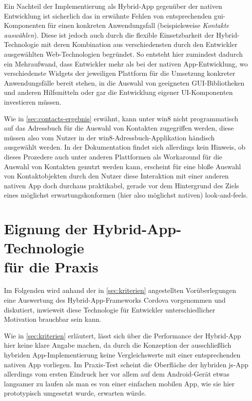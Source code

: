 Ein Nachteil der Implementierung als Hybrid-App gegenüber der nativen Entwicklung ist sicherlich das in  erwähnte Fehlen von entsprechenden \gls{gui}-Komponenten für einen konkreten Anwendungsfall (beispielsweise \emph{Kontakte auswählen}). 
Diese ist jedoch auch durch die flexible Einsetzbarkeit der Hybrid-Technologie mit deren Kombination aus verschiedensten durch den Entwickler ausgewählten Web-Technologien begründet. 
So entsteht hier zumindest dadurch ein Mehraufwand, dass Entwickler mehr als bei der nativen App-Entwicklung, wo verschiedenste Widgets der jeweiligen Plattform für die Umsetzung konkreter Anwendungsfälle bereit stehen, in die Auswahl von geeigneten GUI-Bibliotheken und anderen Hilfsmitteln oder gar die Entwicklung eigener UI-Komponenten investieren müssen.

Wie in \autoref{sec:contacts-ergebnis} erwähnt, kann unter \gls{win8} nicht programmatisch auf das Adressbuch für die Auswahl von Kontakten zugegriffen werden, diese müssen also vom Nutzer in der \gls{win8}-Adressbuch-Applikation händisch ausgewählt werden.
In der Dokumentation findet sich allerdings kein Hinweis, ob dieses Prozedere auch unter anderen Plattformen als Workaround für die Auswahl von Kontakten genutzt werden kann, erscheint für eine bloße Auswahl von Kontaktobjekten durch den Nutzer diese Interaktion mit einer anderen nativen App doch durchaus praktikabel, gerade vor dem Hintergrund des Ziels eines möglichst erwartungskonformen (hier also möglichst nativen) \glspl{look-and-feel}. 

\section{Eignung der Hybrid-App-Technologie \\ für die Praxis}

Im Folgenden wird anhand der in \autoref{sec:kriterien} angestellten Vorüberlegungen eine Auswertung des Hybrid-App-Frameworks Cordova vorgenommen und diskutiert, inwieweit diese Technologie für Entwickler unterschiedlicher Motivation brauchbar sein kann.

Wie in \autoref{sec:kriterien} erläutert, lässt sich über die Performance der Hybrid-App hier keine klare Angabe machen, da durch die Konzeption der ausschließlich hybriden App-Implementierung keine Vergleichswerte mit einer entsprechenden nativen App vorliegen.
Im Praxis-Test scheint die Oberfläche der hybriden \gls{js}-App allerdings vom ersten Eindruck her vor allem auf dem Android-Gerät etwas langsamer zu laufen als man es von einer einfachen mobilen App, wie sie hier prototypisch umgesetzt wurde, erwarten würde.

